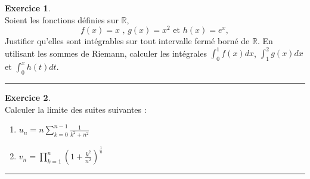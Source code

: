 \documentclass[a4paper,10pt]{article}
\theoremstyle{definition}
\theoremstyle{definition}
\newtheorem{exo}{Exercice}
\newcommand{\R}{\mathbb{R}}
\begin{document}
\begin{minipage}{1\linewidth}
\begin{minipage}[t]{0.48\linewidth}
	\begin{exo}\quad\\
		Soient les fonctions définies sur $\R$,
		$$f(x)=x \text{ , } g(x)=x^2 \text{ et  } h(x)=e^x,$$
		Justifier qu'elles sont intégrables sur tout intervalle fermé borné de $\R$. En utilisant les
		sommes de Riemann, calculer les intégrales $\int_0^1f(x)d x$, $\int_1^2 g(x)
		d x$ et $\int_0^x h(t) d t$.
		
		\centering
		\rule{1\linewidth}{0.6pt}
	\end{exo}	
		
	
	\begin{exo}\quad\\
		Calculer la limite des suites suivantes :
		\begin{enumerate}
			\item $\displaystyle u_n=n\sum_{k=0}^{n-1}\frac 1{k^2+n^2}$
			\item $\displaystyle v_n=\prod\limits_{k=1}^n\left(1+\frac{k^2}{n^2}\right) ^{\frac 1n}$
		\end{enumerate}
		
		\centering
		\rule{1\linewidth}{0.6pt}
	\end{exo}



		
		
	\end{minipage}
\end{minipage}
\end{document}
